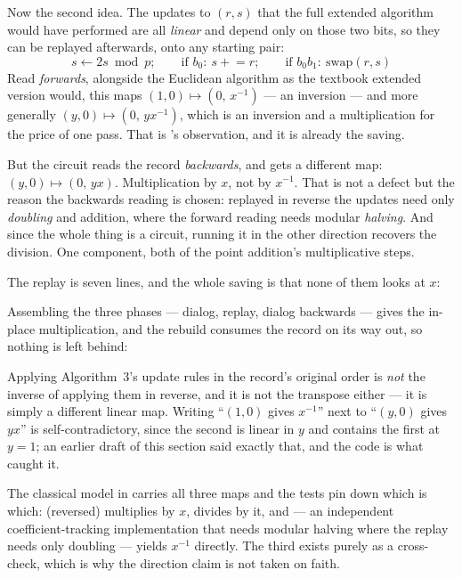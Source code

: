 
\noindent
Now the second idea. The updates to $(r,s)$ that the full extended algorithm would have performed
are all \emph{linear} and depend only on those two bits, so they can be replayed afterwards, onto
any starting pair:
\[
s \leftarrow 2s \bmod p; \qquad \text{if } b_0:\ s \mathrel{+}= r; \qquad \text{if } b_0b_1:\ \text{swap}(r,s)
\]
Read \emph{forwards}, alongside the Euclidean algorithm as the textbook extended version would,
this maps $(1,0)\mapsto(0,\,x^{-1})$ --- an inversion --- and more generally
$(y,0)\mapsto(0,\,yx^{-1})$, which is an inversion and a multiplication for the price of one pass.
That is \cite{ec:schrott26}'s observation, and it is already the saving.

But the circuit reads the record \emph{backwards}, and gets a different map:
$(y,0)\mapsto(0,\,yx)$. Multiplication by $x$, not by $x^{-1}$. That is not a defect but the
reason the backwards reading is chosen: replayed in reverse the updates need only \emph{doubling}
and addition, where the forward reading needs modular \emph{halving}. And since the whole thing is
a circuit, running it in the other direction recovers the division. One component, both of the
point addition's multiplicative steps.

The replay is seven lines, and the whole saving is that none of them looks at $x$:


\noindent
Assembling the three phases --- dialog, replay, dialog backwards --- gives the in-place
multiplication, and the rebuild consumes the record on its way out, so nothing is left behind:


\begin{keybox}[title={Direction matters, and it is easy to get wrong}]
Applying Algorithm~3's update rules in the record's original order is \emph{not} the inverse of
applying them in reverse, and it is not the transpose either --- it is simply a different linear
map. Writing ``$(1,0)$ gives $x^{-1}$'' next to ``$(y,0)$ gives $yx$'' is self-contradictory, since
the second is linear in $y$ and contains the first at $y=1$; an earlier draft of this section said
exactly that, and the code is what caught it.

The classical model in  carries all three maps and the tests pin down which
is which:  (reversed) multiplies by $x$,  divides by
it, and  --- an independent coefficient-tracking implementation
that needs modular halving where the replay needs only doubling --- yields $x^{-1}$ directly. The
third exists purely as a cross-check, which is why the direction claim is not taken on faith.
\end{keybox}

